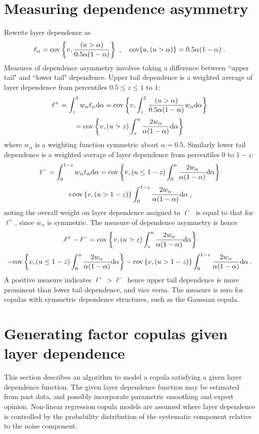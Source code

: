\documentclass[authoryear]{elsarticle}
\newcommand{\cov}{{\rm cov}}
\newcommand{\de}{\mathrm{d}}
\newcommand{\cq}{\ ,\quad }
\begin{document}
\section{Measuring dependence asymmetry}


Rewrite layer dependence as
$$
\ell_\alpha=\cov\left\{v,\frac{(u>\alpha)}{0.5\alpha(1-\alpha)} \right\} \cq \cov\{u,(u>\alpha)\}=0.5\alpha(1-\alpha) \;.
$$
Measures of dependence asymmetry involves taking a difference between ``upper tail" and ``lower tail" dependence. Upper tail dependence is a weighted average of layer dependence from percentiles $0.5\leq z\leq 1$ to $1$:
$$
\ell^+ = \int_z^1 w_\alpha\ell_\alpha \de \alpha
= \cov\left\{ v, \int_z^1 \frac{(u>\alpha)}{0.5\alpha(1-\alpha)} w_\alpha \de \alpha\right\}
$$
$$
=\cov\left\{v,(u>z)\int_z^u \frac{2w_\alpha}{\alpha(1-\alpha)} \de \alpha\right\}
$$
where $w_\alpha$ is a weighting function symmetric about $\alpha=0.5$. Similarly lower tail dependence is a weighted average of layer dependence from percentiles $0$ to $1-z$:
$$
\ell^- = \int_0^{1-z} w_\alpha\ell_\alpha \de \alpha
=\cov\left\{ v, (u\leq 1-z) \int_0^u \frac{2w_\alpha}{\alpha(1-\alpha)} \de \alpha \right\}
$$
$$
+\cov\left\{ v, (u> 1-z)  \right\} \int_0^{1-z}\frac{2w_\alpha}{\alpha(1-\alpha)} \de \alpha \;,
$$
noting the overall weight on layer dependence assigned to $\ell^-$ is equal to that for $\ell^+$, since $w_\alpha$ is symmetric. The measure of dependence asymmetry is hence
$$.
\ell^+-\ell^- = \cov\left\{v,(u>z)\int_z^u \frac{2w_\alpha}{\alpha(1-\alpha)} \de \alpha\right\}
$$
$$
-\cov\left\{ v, (u\leq 1-z) \int_0^u \frac{2w_\alpha}{\alpha(1-\alpha)} \de \alpha \right\}
-\cov\left\{ v, (u> 1-z)  \right\} \int_0^{1-z}\frac{2w_\alpha}{\alpha(1-\alpha)} \de \alpha\;.
$$
A positive measure indicates $\ell^+>\ell^-$ hence upper tail dependence is more prominent than lower tail dependence, and vice versa. The measure is zero for copulas with symmetric dependence structures, such as the Gaussian copula.



\section{Generating factor copulas given layer dependence}


This section describes an algorithm to model a copula satisfying a given layer dependence function. The given layer dependence function may be estimated from past data, and possibly incorporate parametric smoothing and expert opinion. Non-linear regression copula models are assumed where layer dependence is controlled by the probability distribution of the systematic component relative to the noise component.
\end{document}

